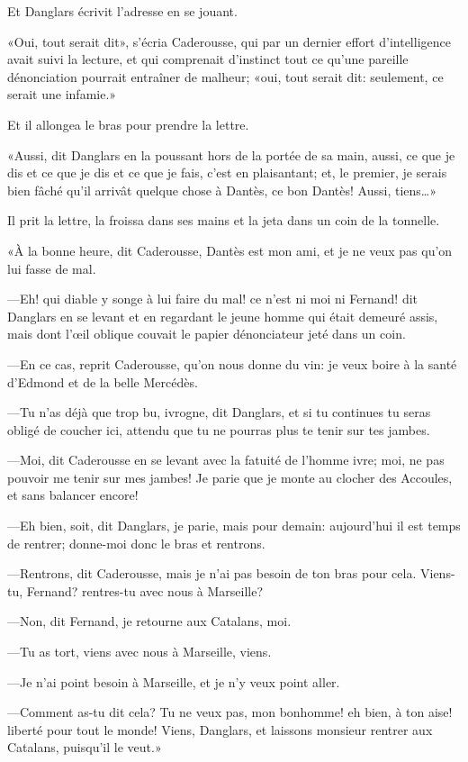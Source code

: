 Et Danglars écrivit l'adresse en se jouant.

«Oui, tout serait dit», s'écria Caderousse, qui par un dernier effort d'intelligence avait suivi la lecture, et qui comprenait d'instinct tout ce qu'une pareille dénonciation pourrait entraîner de malheur; «oui, tout serait dit: seulement, ce serait une infamie.»

Et il allongea le bras pour prendre la lettre.

«Aussi, dit Danglars en la poussant hors de la portée de sa main, aussi, ce que je dis et ce que je dis et ce que je fais, c'est en plaisantant; et, le premier, je serais bien fâché qu'il arrivât quelque chose à Dantès, ce bon Dantès! Aussi, tiens\dots»

Il prit la lettre, la froissa dans ses mains et la jeta dans un coin de la tonnelle.

«À la bonne heure, dit Caderousse, Dantès est mon ami, et je ne veux pas qu'on lui fasse de mal.

—Eh! qui diable y songe à lui faire du mal! ce n'est ni moi ni Fernand! dit Danglars en se levant et en regardant le jeune homme qui était demeuré assis, mais dont l'œil oblique couvait le papier dénonciateur jeté dans un coin.

—En ce cas, reprit Caderousse, qu'on nous donne du vin: je veux boire à la santé d'Edmond et de la belle Mercédès.

—Tu n'as déjà que trop bu, ivrogne, dit Danglars, et si tu continues tu seras obligé de coucher ici, attendu que tu ne pourras plus te tenir sur tes jambes.

—Moi, dit Caderousse en se levant avec la fatuité de l'homme ivre; moi, ne pas pouvoir me tenir sur mes jambes! Je parie que je monte au clocher des Accoules, et sans balancer encore!

—Eh bien, soit, dit Danglars, je parie, mais pour demain: aujourd'hui il est temps de rentrer; donne-moi donc le bras et rentrons.

—Rentrons, dit Caderousse, mais je n'ai pas besoin de ton bras pour cela. Viens-tu, Fernand? rentres-tu avec nous à Marseille?

—Non, dit Fernand, je retourne aux Catalans, moi.

—Tu as tort, viens avec nous à Marseille, viens.

—Je n'ai point besoin à Marseille, et je n'y veux point aller.

—Comment as-tu dit cela? Tu ne veux pas, mon bonhomme! eh bien, à ton aise! liberté pour tout le monde! Viens, Danglars, et laissons monsieur rentrer aux Catalans, puisqu'il le veut.»

